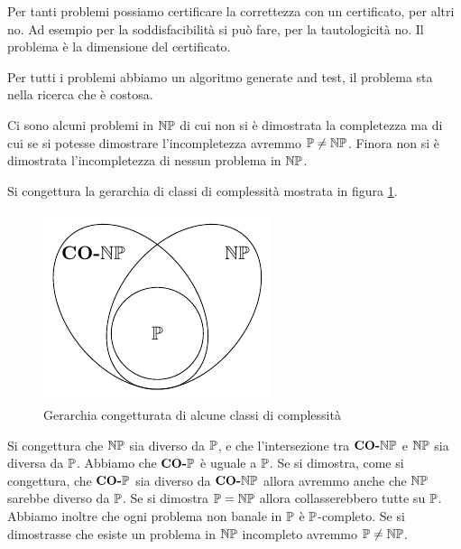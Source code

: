 Per tanti problemi possiamo certificare la correttezza con un certificato, per altri no. Ad esempio
per la soddisfacibilità si può fare, per la tautologicità no. Il problema è la dimensione del
certificato.

Per tutti i problemi abbiamo un algoritmo generate and test, il problema sta nella ricerca che è
costosa.


Ci sono alcuni problemi in $\mathbb{NP}$ di cui non si è dimostrata la completezza ma di cui se si potesse
dimostrare l'incompletezza avremmo $\mathbb{P} \not= \mathbb{NP}$. Finora non si è dimostrata l'incompletezza di
nessun problema in $\mathbb{NP}$.


Si congettura la gerarchia di classi di complessità mostrata in figura \ref{ConjecturedHierarchy}.

\begin{figure}[h]
    \begin{center}
        \includegraphics{img/NPCONP.pdf}
    \end{center}
    \caption{Gerarchia congetturata di alcune classi di complessità}
    \label{ConjecturedHierarchy}
\end{figure}

Si congettura che $\mathbb{NP}$ sia diverso da $\mathbb{P}$, e che l'intersezione tra $\textbf{CO-}\mathbb{NP}$ e
$\mathbb{NP}$ sia diversa da $\mathbb{P}$. Abbiamo che $\textbf{CO-}\mathbb{P}$ è uguale a $\mathbb{P}$. Se si dimostra,
come si congettura, che $\textbf{CO-}\mathbb{P}$ sia diverso da $\textbf{CO-}\mathbb{NP}$ allora avremmo anche che $\mathbb{NP}$
sarebbe diverso da $\mathbb{P}$. Se si dimostra $\mathbb{P} = \mathbb{NP}$ allora
collasserebbero tutte su $\mathbb{P}$. Abbiamo inoltre che ogni problema non banale in $\mathbb{P}$ è
$\mathbb{P}$-completo. Se si dimostrasse che esiste un problema in $\mathbb{NP}$ incompleto avremmo
$\mathbb{P} \not= \mathbb{NP}$.

